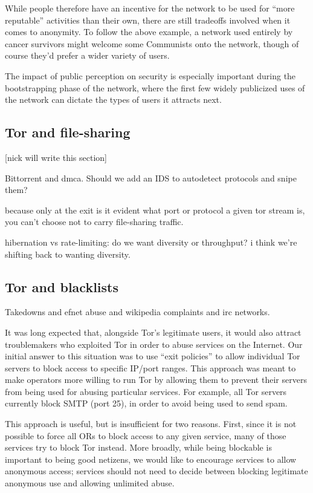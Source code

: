 \documentclass{llncs}
\begin{document}
While people therefore have an incentive for the network to be used for
``more reputable'' activities than their own, there are still tradeoffs
involved when it comes to anonymity. To follow the above example, a
network used entirely by cancer survivors might welcome some Communists
onto the network, though of course they'd prefer a wider variety of users.

The impact of public perception on security is especially important
during the bootstrapping phase of the network, where the first few
widely publicized uses of the network can dictate the types of users it
attracts next.

\subsection{Tor and file-sharing}

[nick will write this section]

Bittorrent and dmca. Should we add an IDS to autodetect protocols and
snipe them?

because only at the exit is it evident what port or protocol a given
tor stream is, you can't choose not to carry file-sharing traffic.

hibernation vs rate-limiting: do we want diversity or throughput? i
think we're shifting back to wanting diversity.

\subsection{Tor and blacklists}

Takedowns and efnet abuse and wikipedia complaints and irc
networks.

It was long expected that, alongside Tor's legitimate users, it would also
attract troublemakers who exploited Tor in order to abuse services on the
Internet.  Our initial answer to this situation was to use ``exit policies''
to allow individual Tor servers to block access to specific IP/port ranges.
This approach was meant to make operators more willing to run Tor by allowing
them to prevent their servers from being used for abusing particular
services.  For example, all Tor servers currently block SMTP (port 25), in
order to avoid being used to send spam.

This approach is useful, but is insufficient for two reasons.  First, since
it is not possible to force all ORs to block access to any given service,
many of those services try to block Tor instead.  More broadly, while being
blockable is important to being good netizens, we would like to encourage
services to allow anonymous access; services should not need to decide
between blocking legitimate anonymous use and allowing unlimited abuse.
\end{document}
